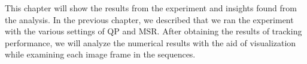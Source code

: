 This chapter will show the results from the experiment and insights found from the analysis. In the previous chapter, we described that we ran the experiment with the various settings of QP and MSR. After obtaining the results of tracking performance, we will analyze the numerical results with the aid of visualization while examining each image frame in the sequences.